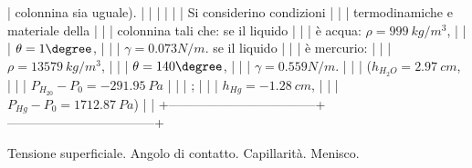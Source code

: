 \documentclass[letterpaper,10pt,italian]{jupyterBook}
\begin{document}
| colonnina sia uguale).            |                                   |
|                                   |                                   |
| Si considerino condizioni         |                                   |
| termodinamiche e materiale della  |                                   |
| colonnina tali che: se il liquido |                                   |
| è acqua: \(\rho = 999 \ kg/m^3\),   |                                   |
| \(\theta={1}\degree\),              |                                   |
| \(\gamma=0.073 N/m\). se il liquido |                                   |
| è mercurio:                       |                                   |
| \(\rho = 13579 \ kg/m^3\),          |                                   |
| \(\theta={140}\degree\),            |                                   |
| \(\gamma=0.559 N/m\).               |                                   |
| (\(h_{H_2O} = 2.97 \ cm\),          |                                   |
| \(P_{H_20} - P_0 =  - 291.95 \ Pa\) |                                   |
| ;                                 |                                   |
| \(h_{Hg} = -1.28 \ cm\),            |                                   |
| \(P_{Hg} - P_0 =  1712.87 \ Pa\))   |                                   |
+———————————–+———————————–+

\sphinxAtStartPar
Tensione superficiale. Angolo di contatto. Capillarità. Menisco.
\end{document}

